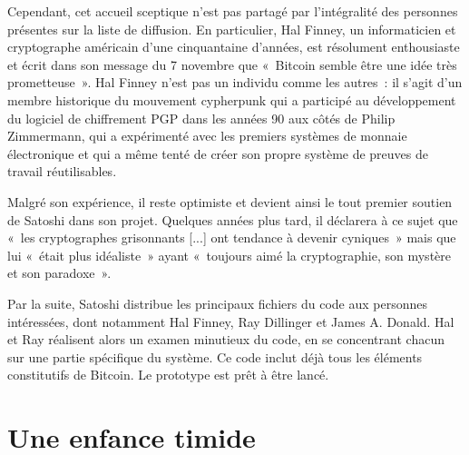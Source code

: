 Cependant, cet accueil sceptique n'est pas partagé par l'intégralité des personnes présentes sur la liste de diffusion. En particulier, Hal Finney, un informaticien et cryptographe américain d'une cinquantaine d'années, est résolument enthousiaste et écrit dans son message du 7 novembre que «~Bitcoin semble être une idée très prometteuse~». Hal Finney n'est pas un individu comme les autres~: il s'agit d'un membre historique du mouvement cypherpunk qui a participé au développement du logiciel de chiffrement PGP dans les années 90 aux côtés de Philip Zimmermann, qui a expérimenté avec les premiers systèmes de monnaie électronique et qui a même tenté de créer son propre système de preuves de travail réutilisables. 

Malgré son expérience, il reste optimiste et devient ainsi le tout premier soutien de Satoshi dans son projet. Quelques années plus tard, il déclarera à ce sujet que «~les cryptographes grisonnants [...] ont tendance à devenir cyniques~» mais que lui «~était plus idéaliste~» ayant «~toujours aimé la cryptographie, son mystère et son paradoxe~». 

Par la suite, Satoshi distribue les principaux fichiers du code aux personnes intéressées, dont notamment Hal Finney, Ray Dillinger et James A. Donald. Hal et Ray réalisent alors un examen minutieux du code, en se concentrant chacun sur une partie spécifique du système. Ce code inclut déjà tous les éléments constitutifs de Bitcoin. Le prototype est prêt à être lancé.

\section{Une enfance timide}

